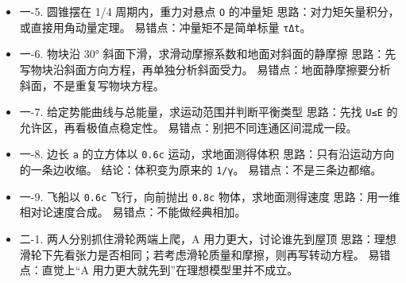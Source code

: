 \documentclass[12pt,a4paper]{ctexart}
\begin{document}
\begin{itemize}

\item 一-5. 圆锥摆在 1/4 周期内，重力对悬点 \texttt{O} 的冲量矩 思路：对力矩矢量积分，或直接用角动量定理。 易错点：冲量矩不是简单标量 \texttt{τΔt}。

\end{itemize}

\begin{itemize}

\item 一-6. 物块沿 30° 斜面下滑，求滑动摩擦系数和地面对斜面的静摩擦 思路：先写物块沿斜面方向方程，再单独分析斜面受力。 易错点：地面静摩擦要分析斜面，不是重复写物块方程。

\end{itemize}

\begin{itemize}

\item 一-7. 给定势能曲线与总能量，求运动范围并判断平衡类型 思路：先找 \texttt{U≤E} 的允许区，再看极值点稳定性。 易错点：别把不同连通区间混成一段。

\end{itemize}

\begin{itemize}

\item 一-8. 边长 \texttt{a} 的立方体以 \texttt{0.6c} 运动，求地面测得体积 思路：只有沿运动方向的一条边收缩。 结论：体积变为原来的 \texttt{1/γ}。 易错点：不是三条边都缩。

\end{itemize}

\begin{itemize}

\item 一-9. 飞船以 \texttt{0.6c} 飞行，向前抛出 \texttt{0.8c} 物体，求地面测得速度 思路：用一维相对论速度合成。 易错点：不能做经典相加。

\end{itemize}

\begin{itemize}

\item 二-1. 两人分别抓住滑轮两端上爬，A 用力更大，讨论谁先到屋顶 思路：理想滑轮下先看张力是否相同；若考虑滑轮质量和摩擦，则再写转动方程。 易错点：直觉上“A 用力更大就先到”在理想模型里并不成立。

\end{itemize}
\end{document}
